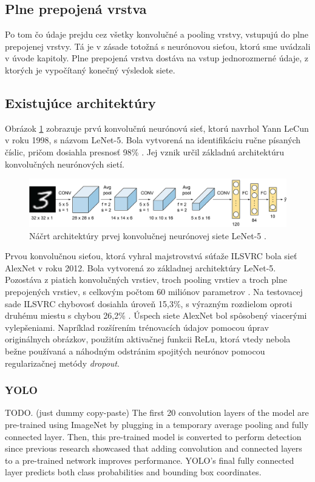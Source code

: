 \subsection{Plne prepojená vrstva}

Po tom čo údaje prejdu cez všetky konvolučné a pooling vrstvy, vstupujú do plne prepojenej vrstvy. Tá je v zásade totožná s neurónovou sieťou, ktorú sme uvádzali v úvode kapitoly. Plne prepojená vrstva dostáva na vstup jednorozmerné údaje, z ktorých je vypočítaný konečný výsledok siete.

\subsection{Existujúce architektúry}

Obrázok \ref{img:lenet} zobrazuje prvú konvolučnú neurónovú sieť, ktorú navrhol Yann LeCun v roku 1998, s názvom LeNet-5. Bola vytvorená na identifikáciu ručne písaných číslic, pričom dosiahla presnosť 98\% \cite{lenet}. Jej vznik určil základnú architektúru konvolučných neurónových sietí.

\begin{figure}[ht]
    \centering
    \includegraphics[width=1\textwidth]{images/02/lenet5.png}
    \caption{Náčrt architektúry prvej konvolučnej neurónovej siete LeNet-5 \cite{lenet}.}
    \label{img:lenet}
\end{figure}

Prvou konvolučnou sieťou, ktorá vyhral majstrovstvá súťaže ILSVRC bola sieť AlexNet v roku 2012. Bola vytvorená zo základnej architektúry LeNet-5. Pozostáva z piatich konvolučných vrstiev, troch pooling vrstiev a troch plne prepojených vrstiev, s celkovým počtom 60 miliónov parametrov \cite{AlexNet}. Na testovacej sade ILSVRC chybovosť dosiahla úroveň 15,3\%, s výrazným rozdielom oproti druhému miestu s chybou 26,2\% \cite{ilsvrc}. Úspech siete AlexNet bol spôsobený viacerými vylepšeniami. Napríklad rozšírením trénovacích údajov pomocou úprav originálnych obrázkov, použitím aktivačnej funkcii ReLu, ktorá vtedy nebola bežne používaná a náhodným odstránim spojitých neurónov pomocou regularizačnej metódy \textit{dropout}.

\subsubsection{YOLO}
TODO. (just dummy copy-paste) The first 20 convolution layers of the model are pre-trained using ImageNet by plugging in a temporary average pooling and fully connected layer. Then, this pre-trained model is converted to perform detection since previous research showcased that adding convolution and connected layers to a pre-trained network improves performance. YOLO’s final fully connected layer predicts both class probabilities and bounding box coordinates.

